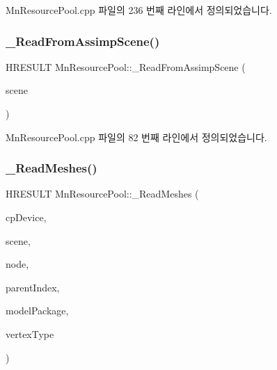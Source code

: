 Mn\+Resource\+Pool.\+cpp 파일의 236 번째 라인에서 정의되었습니다.

\mbox{\label{class_m_n_l_1_1_mn_resource_pool_a455ca59fa1823515c934b62812ef7166}} 
\subsubsection{\texorpdfstring{\+\_\+\+Read\+From\+Assimp\+Scene()}{\_ReadFromAssimpScene()}}
{\footnotesize\ttfamily H\+R\+E\+S\+U\+LT Mn\+Resource\+Pool\+::\+\_\+\+Read\+From\+Assimp\+Scene (\begin{DoxyParamCaption}\item[{const ai\+Scene $\ast$}]{scene }\end{DoxyParamCaption})\hspace{0.3cm}{\ttfamily [private]}}



Mn\+Resource\+Pool.\+cpp 파일의 82 번째 라인에서 정의되었습니다.

\mbox{\label{class_m_n_l_1_1_mn_resource_pool_a69b5a13be982eeca8212d83d9dd7731c}} 
\subsubsection{\texorpdfstring{\+\_\+\+Read\+Meshes()}{\_ReadMeshes()}}
{\footnotesize\ttfamily H\+R\+E\+S\+U\+LT Mn\+Resource\+Pool\+::\+\_\+\+Read\+Meshes (\begin{DoxyParamCaption}\item[{const \hyperlink{namespace_m_n_l_a1eec210db8f309a4a9ac0d9658784c31}{C\+P\+D3\+D\+Device} \&}]{cp\+Device,  }\item[{const ai\+Scene $\ast$}]{scene,  }\item[{const ai\+Node $\ast$}]{node,  }\item[{U\+I\+NT}]{parent\+Index,  }\item[{\hyperlink{struct_m_n_l_1_1_mn_resource_pool_1_1___model_package}{\+\_\+\+Model\+Package} \&}]{model\+Package,  }\item[{const std\+::shared\+\_\+ptr$<$ \hyperlink{class_m_n_l_1_1_mn_custom_vertex_type}{Mn\+Custom\+Vertex\+Type} $>$ \&}]{vertex\+Type }\end{DoxyParamCaption})\hspace{0.3cm}{\ttfamily [private]}}

